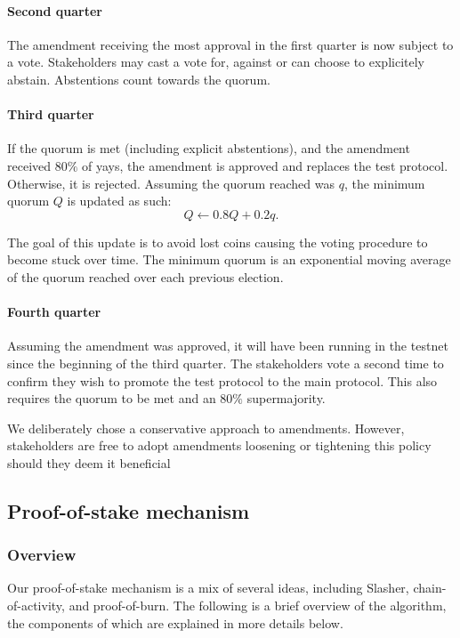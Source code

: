 \documentclass[letterpaper]{article}
\begin{document}
\paragraph{Second quarter}
The amendment receiving the most approval in the first quarter is now subject to
a vote. Stakeholders may cast a vote for, against or can choose to explicitely
abstain. Abstentions count towards the quorum.

\paragraph{Third quarter} If the quorum is met (including explicit abstentions),
and the amendment received $80\%$ of yays, the amendment is approved and
replaces the test protocol. Otherwise, it is rejected.
Assuming the quorum reached was $q$, the minimum quorum $Q$ is updated as such:
$$Q \leftarrow 0.8 Q + 0.2 q.$$

The goal of this update is to avoid lost coins causing the voting procedure to
become stuck over time. The minimum quorum is an exponential moving average of
the quorum reached over each previous election.

\paragraph{Fourth quarter} Assuming the amendment was approved, it will have
been running in the testnet since the beginning of the third quarter.
The stakeholders vote a second time to confirm they wish to promote the test
protocol to the main protocol. This also requires the quorum to be met and an
$80\%$ supermajority.

We deliberately chose a conservative approach to amendments. However,
stakeholders are free to adopt amendments loosening or tightening this policy 
should they deem it beneficial

\subsection{Proof-of-stake mechanism}

\subsubsection{Overview}

Our proof-of-stake mechanism is a mix of several ideas, including
Slasher\cite{Slasher}, chain-of-activity\cite{CoA}, and proof-of-burn.
The following is a brief overview of the algorithm, the components of which
are explained in more details below.
\end{document}
